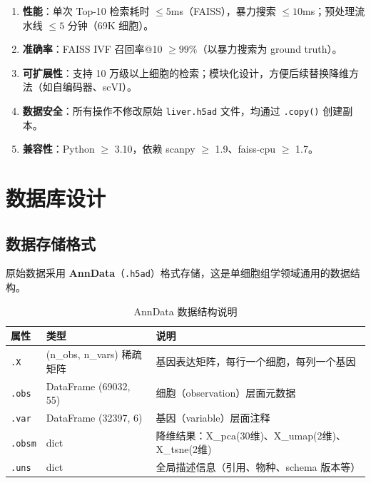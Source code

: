 \documentclass[12pt,a4paper]{ctexart}
\begin{document}
\begin{enumerate}[label=NFR-\arabic*:,leftmargin=*]
    \item \textbf{性能}：单次 Top-10 检索耗时 $\le 5$ms（FAISS），暴力搜索 $\le 10$ms；预处理流水线 $\le 5$ 分钟（69K 细胞）。
    \item \textbf{准确率}：FAISS IVF 召回率@10 $\ge 99\%$（以暴力搜索为 ground truth）。
    \item \textbf{可扩展性}：支持 10 万级以上细胞的检索；模块化设计，方便后续替换降维方法（如自编码器、scVI）。
    \item \textbf{数据安全}：所有操作不修改原始 \texttt{liver.h5ad} 文件，均通过 \texttt{.copy()} 创建副本。
    \item \textbf{兼容性}：Python $\ge$ 3.10，依赖 scanpy $\ge$ 1.9、faiss-cpu $\ge$ 1.7。
\end{enumerate}

\section{数据库设计}

\subsection{数据存储格式}

原始数据采用 \textbf{AnnData}（\texttt{.h5ad}）格式存储，这是单细胞组学领域通用的数据结构。

\begin{table}[H]
\centering
\caption{AnnData 数据结构说明}
\begin{tabular}{l|l|p{6cm}}
\toprule
\textbf{属性} & \textbf{类型} & \textbf{说明} \\
\midrule
\texttt{.X}   & (n\_obs, n\_vars) 稀疏矩阵 & 基因表达矩阵，每行一个细胞，每列一个基因 \\
\texttt{.obs}  & DataFrame (69032, 55) & 细胞（observation）层面元数据 \\
\texttt{.var}  & DataFrame (32397, 6)  & 基因（variable）层面注释 \\
\texttt{.obsm} & dict & 降维结果：X\_pca(30维)、X\_umap(2维)、X\_tsne(2维) \\
\texttt{.uns}  & dict & 全局描述信息（引用、物种、schema 版本等） \\
\bottomrule
\end{tabular}
\end{table}
\end{document}

